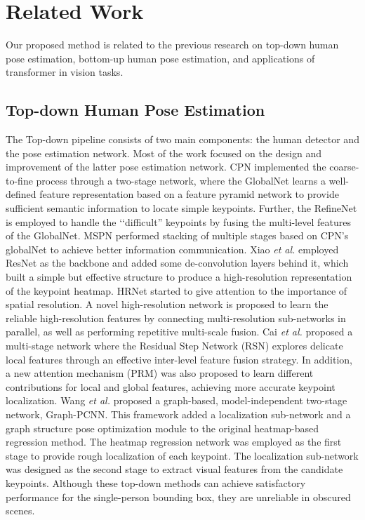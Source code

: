 \documentclass[runningheads]{llncs}
\begin{document}
\section{Related Work} \label{sec:RelatedWork}
Our proposed method is related to the previous research on top-down human pose estimation, bottom-up human pose estimation, and applications of transformer in vision tasks.

\subsection{Top-down Human Pose Estimation}
The Top-down pipeline consists of two main components: the human detector and the pose estimation network. Most of the work \cite{CPN2018,MSPN2019,simple_baseline2018,HRNet2019,RSN2020,graph2020} focused on the design and improvement of the latter pose estimation network. CPN \cite{CPN2018} implemented the coarse-to-fine process through a two-stage network, where the GlobalNet learns a well-defined feature representation based on a feature pyramid network to provide sufficient semantic information to locate simple keypoints. Further, the RefineNet is employed to handle the ‘‘difficult'' keypoints by fusing the multi-level features of the GlobalNet. MSPN \cite{MSPN2019} performed stacking of multiple stages based on CPN's globalNet to achieve better information communication. Xiao \textit{et al.} \cite{simple_baseline2018} employed ResNet as the backbone and added some de-convolution layers behind it, which built a simple but effective structure to produce a high-resolution representation of the keypoint heatmap. HRNet \cite{HRNet2019} started to give attention to the importance of spatial resolution. A novel high-resolution network is proposed to learn the reliable high-resolution features by connecting multi-resolution sub-networks in parallel, as well as performing repetitive multi-scale fusion. Cai \textit{et al.} \cite{RSN2020} proposed a multi-stage network where the Residual Step Network (RSN) explores delicate local features through an effective inter-level feature fusion strategy. In addition, a new attention mechanism (PRM) was also proposed to learn different contributions for local and global features, achieving more accurate keypoint localization. Wang \textit{et al.} \cite{graph2020} proposed a graph-based, model-independent two-stage network, Graph-PCNN. This framework added a localization sub-network and a graph structure pose optimization module to the original heatmap-based regression method. The heatmap regression network was employed as the first stage to provide rough localization of each keypoint. The localization sub-network was designed as the second stage to extract visual features from the candidate keypoints. Although these top-down methods can achieve satisfactory performance for the single-person bounding box, they are unreliable in obscured scenes. 
\end{document}
